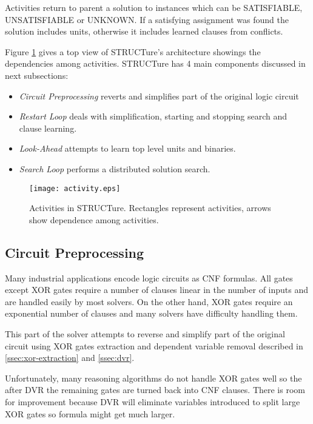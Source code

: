 Activities return to parent a solution to instances which can be
\textsf{SATISFIABLE}, \textsf{UNSATISFIABLE} or \textsf{UNKNOWN}. If
a satisfying assignment was found the solution includes units,
otherwise it includes learned clauses from conflicts.

Figure \ref{fig:activities} gives a top view of STRUCTure's
architecture showings the dependencies among activities.
STRUCTure has 4 main components discussed in next subsections:
\begin{itemize}
  \item \emph{Circuit Preprocessing} reverts and simplifies 
  part of the original logic circuit
  \item \emph{Restart Loop} deals with simplification,
  starting and stopping search and clause learning.
  \item \emph{Look-Ahead} attempts to learn top level units and binaries.
  \item \emph{Search Loop} performs a distributed solution search.
\end{itemize}

\begin{figure}
  \centering
  \texttt{[image: activity.eps]}
  \caption{Activities in STRUCTure. Rectangles represent activities, arrows
  show dependence among activities.}
  \label{fig:activities}
\end{figure}


\subsection{Circuit Preprocessing}

Many industrial applications encode logic circuits as CNF formulas.
All gates except XOR gates require a number of clauses linear in
the number of inputs and are handled easily by most solvers. On
the other hand, XOR gates require an exponential number of clauses
and many solvers have difficulty handling them.

This part of the solver attempts to reverse and simplify part of the
original circuit using XOR gates extraction and dependent variable
removal described in \ref{ssec:xor-extraction} and \ref{ssec:dvr}.

Unfortunately, many reasoning algorithms do not handle XOR gates
well so the after DVR the remaining gates are turned back into CNF
clauses. There is room for improvement because DVR will eliminate
variables introduced to split large XOR gates so formula might get
much larger.


